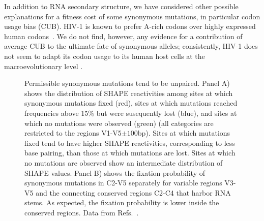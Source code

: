 \documentclass[rmp, twocolumn]{revtex4}
\newcommand{\shankaregion}{C2-V5}
\begin{document}
In addition to RNA secondary structure, we have considered other possible
explanations for a fitness cost of some synonymous mutations, in particular codon
usage bias (CUB). HIV-1 is known to prefer A-rich codons over highly expressed
human codons~\citep{jenkins_extent_2003,kuyl_biased_2012}. We do not find,
however, any evidence for a contribution of average CUB to the ultimate fate of
synonymous alleles; consistently, HIV-1 does not seem to adapt its codon usage to
its human host cells at the macroevolutionary level \citep{kuyl_biased_2012}.

\begin{figure}
\begin{center}
\caption{Permissible synonymous mutations tend to be unpaired.
Panel A) shows the distribution of SHAPE reactivities among sites at which synonymous 
mutations fixed (red), sites at which mutations reached frequencies above 15\% but
were susequently lost (blue), and sites at which no mutations were observed (green) 
(all categories are restricted to the regions V1-V5$\pm 100$bp).
Sites at which mutations fixed tend to have higher SHAPE reactivities, corresponding to
less base pairing, than those at which mutations are lost.
Sites at which no mutations are observed show an intermediate distribution of SHAPE values.
Panel B) shows the fixation probability of synonymous mutations in
\shankaregion{} separately for variable regions V3-V5 and the connecting conserved 
regions C2-C4 that harbor RNA stems. As expected, the fixation probability is lower
inside the conserved regions. Data from Refs.~\cite{shankarappa_consistent_1999,
bunnik_autologous_2008, liu_selection_2006}.}
\label{fig:SHAPE}
\end{center}
\end{figure}
\end{document}
